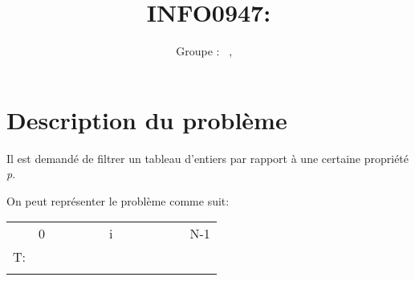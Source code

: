 \documentclass[a4paper, 11pt, oneside]{article}
\title{INFO0947: \intitule}
\author{Groupe \GrNbr : \PrenomUN~\textsc{\NomUN}, \PrenomDEUX~\textsc{\NomDEUX}}
\date{}
\newcommand{\tablemat}{~}
\renewcommand{\tablemat}{\tableofcontents}
\begin{document}
\maketitle
\newpage
\tablemat
\newpage


\section{Description du problème}

    Il est demandé de filtrer un tableau d'entiers par rapport à une certaine propriété \textit{p}.

    On peut représenter le problème comme suit:

    \begin{table}[!h]
    \centering
    \begin{tabular}{lllllllllllll}
    \multicolumn{1}{l|}{}   & 0                        &                          &                          &                          &                          & \multicolumn{1}{r|}{i}                        &                          &                          &                          &                          &                          & \multicolumn{1}{r|}{N-1}                      \\ \cline{2-13} 
    \multicolumn{1}{r|}{T:} & \cellcolor[HTML]{3531FF} & \cellcolor[HTML]{3531FF} & \cellcolor[HTML]{3531FF} & \cellcolor[HTML]{3531FF} & \cellcolor[HTML]{3531FF} & \multicolumn{1}{l|}{\cellcolor[HTML]{3531FF}} & \cellcolor[HTML]{9A0000} & \cellcolor[HTML]{9A0000} & \cellcolor[HTML]{9A0000} & \cellcolor[HTML]{9A0000} & \cellcolor[HTML]{9A0000} & \multicolumn{1}{l|}{\cellcolor[HTML]{9A0000}} \\ \cline{2-13} 
                            &                          &                          &                          &                          &                          &                                               &                          &                          &                          &                          &                          &                                              
    \end{tabular}
    \end{table}
\end{document}
